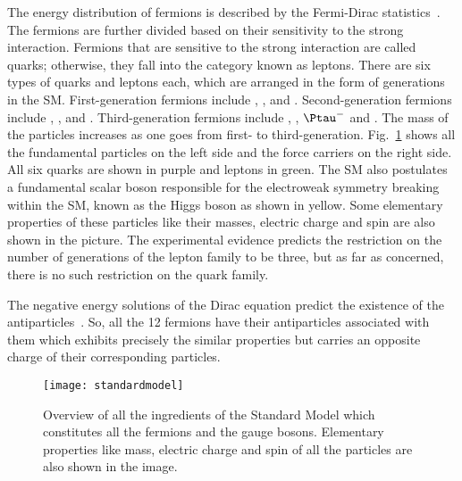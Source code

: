 The energy distribution of fermions is described by the Fermi-Dirac statistics~\cite{thomson}. The fermions are further divided based on their sensitivity to the strong interaction. Fermions that are sensitive to the strong interaction are called quarks; otherwise, they fall into the category known as leptons. There are six types of quarks and leptons each, which are arranged in the form of generations in the SM. First-generation fermions include \Pup, \Pdown, \Pelectron and \Pnue. Second-generation fermions include \Pcharm, \Pstrange, \Pmuon and \Pnum. Third-generation fermions include \Ptop, \Pbottom, $\Ptau^{-}$ and \Pnut. The mass of the particles increases as one goes from first- to third-generation. Fig.\ \ref{fig:theory:standardmodel} shows all the fundamental particles on the left side and the force carriers on the right side. All six quarks are shown in purple and leptons in green. The SM also postulates a fundamental scalar boson responsible for the electroweak symmetry breaking within the SM, known as the Higgs boson as shown in yellow. Some elementary properties of these particles like their masses, electric charge and spin are also shown in the picture. The experimental evidence predicts the restriction on the number of generations of the lepton family to be three, but as far as concerned, there is no such restriction on the quark family.

The negative energy solutions of the Dirac equation predict the existence of the antiparticles~\cite{thomson}. So, all the 12 fermions have their antiparticles associated with them which exhibits precisely
the similar properties but carries an opposite charge of their corresponding particles.

\begin{figure}[hbt!]
	\centering
	\texttt{[image: standardmodel]}
	\caption{Overview of all the ingredients of the Standard Model which constitutes all the fermions and the gauge bosons. Elementary properties like mass, electric charge and spin of all the particles are also shown in the image.~\cite{standardmodelpicture}}
	\label{fig:theory:standardmodel}
\end{figure}



